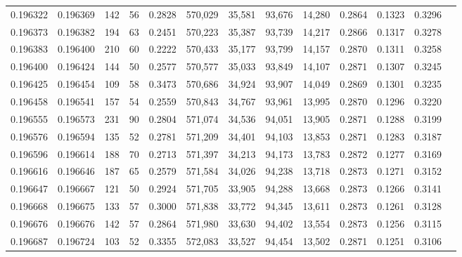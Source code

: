 \begin{tabular}{rrrrrrrrrrrrr}
0.196322 & 0.196369 &   142 &  56 &                                     0.2828 & 570,029 &  35,581 &  93,676 &  14,280 & 0.2864 & 0.1323 & 0.3296 \\
0.196373 & 0.196382 &   194 &  63 &                                     0.2451 & 570,223 &  35,387 &  93,739 &  14,217 & 0.2866 & 0.1317 & 0.3278 \\
0.196383 & 0.196400 &   210 &  60 &                                     0.2222 & 570,433 &  35,177 &  93,799 &  14,157 & 0.2870 & 0.1311 & 0.3258 \\
0.196400 & 0.196424 &   144 &  50 &                                     0.2577 & 570,577 &  35,033 &  93,849 &  14,107 & 0.2871 & 0.1307 & 0.3245 \\
0.196425 & 0.196454 &   109 &  58 &                                     0.3473 & 570,686 &  34,924 &  93,907 &  14,049 & 0.2869 & 0.1301 & 0.3235 \\
0.196458 & 0.196541 &   157 &  54 &                                     0.2559 & 570,843 &  34,767 &  93,961 &  13,995 & 0.2870 & 0.1296 & 0.3220 \\
0.196555 & 0.196573 &   231 &  90 &                                     0.2804 & 571,074 &  34,536 &  94,051 &  13,905 & 0.2871 & 0.1288 & 0.3199 \\
0.196576 & 0.196594 &   135 &  52 &                                     0.2781 & 571,209 &  34,401 &  94,103 &  13,853 & 0.2871 & 0.1283 & 0.3187 \\
0.196596 & 0.196614 &   188 &  70 &                                     0.2713 & 571,397 &  34,213 &  94,173 &  13,783 & 0.2872 & 0.1277 & 0.3169 \\
0.196616 & 0.196646 &   187 &  65 &                                     0.2579 & 571,584 &  34,026 &  94,238 &  13,718 & 0.2873 & 0.1271 & 0.3152 \\
0.196647 & 0.196667 &   121 &  50 &                                     0.2924 & 571,705 &  33,905 &  94,288 &  13,668 & 0.2873 & 0.1266 & 0.3141 \\
0.196668 & 0.196675 &   133 &  57 &                                     0.3000 & 571,838 &  33,772 &  94,345 &  13,611 & 0.2873 & 0.1261 & 0.3128 \\
0.196676 & 0.196676 &   142 &  57 &                                     0.2864 & 571,980 &  33,630 &  94,402 &  13,554 & 0.2873 & 0.1256 & 0.3115 \\
0.196687 & 0.196724 &   103 &  52 &                                     0.3355 & 572,083 &  33,527 &  94,454 &  13,502 & 0.2871 & 0.1251 & 0.3106 \\

\end{tabular}
